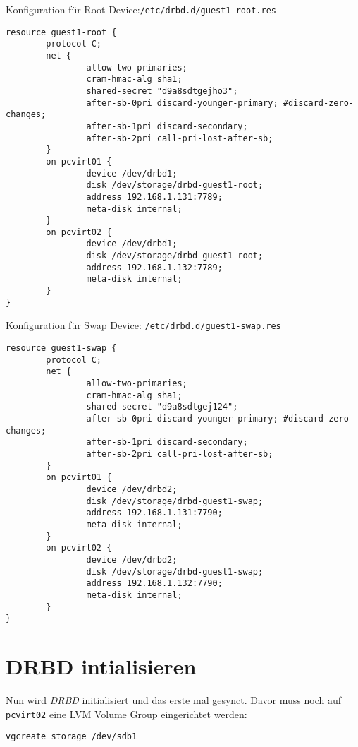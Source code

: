 Konfiguration für Root Device:\verb|/etc/drbd.d/guest1-root.res|
\setupVerbatimOut
\begin{verbatim}
resource guest1-root {
        protocol C;
        net {
                allow-two-primaries;
                cram-hmac-alg sha1;
                shared-secret "d9a8sdtgejho3";
                after-sb-0pri discard-younger-primary; #discard-zero-changes;
                after-sb-1pri discard-secondary;
                after-sb-2pri call-pri-lost-after-sb;
        }
        on pcvirt01 {
                device /dev/drbd1;
                disk /dev/storage/drbd-guest1-root;
                address 192.168.1.131:7789;
                meta-disk internal;
        }
        on pcvirt02 {
                device /dev/drbd1;
                disk /dev/storage/drbd-guest1-root;
                address 192.168.1.132:7789;
                meta-disk internal;
        }
}
\end{verbatim}

Konfiguration für Swap Device: \verb|/etc/drbd.d/guest1-swap.res|
\setupVerbatimOut
\begin{verbatim}
resource guest1-swap {
        protocol C;
        net {
                allow-two-primaries;
                cram-hmac-alg sha1;
                shared-secret "d9a8sdtgej124";
                after-sb-0pri discard-younger-primary; #discard-zero-changes;
                after-sb-1pri discard-secondary;
                after-sb-2pri call-pri-lost-after-sb;
        }
        on pcvirt01 {
                device /dev/drbd2;
                disk /dev/storage/drbd-guest1-swap;
                address 192.168.1.131:7790;
                meta-disk internal;
        }
        on pcvirt02 {
                device /dev/drbd2;
                disk /dev/storage/drbd-guest1-swap;
                address 192.168.1.132:7790;
                meta-disk internal;
        }
}
\end{verbatim}


\section{DRBD intialisieren}

Nun wird \emph{DRBD} initialisiert und das erste mal gesynct. Davor muss noch auf \verb#pcvirt02# eine LVM Volume Group eingerichtet werden:

\setupVerbatimOut
\begin{verbatim}
vgcreate storage /dev/sdb1 
\end{verbatim}

